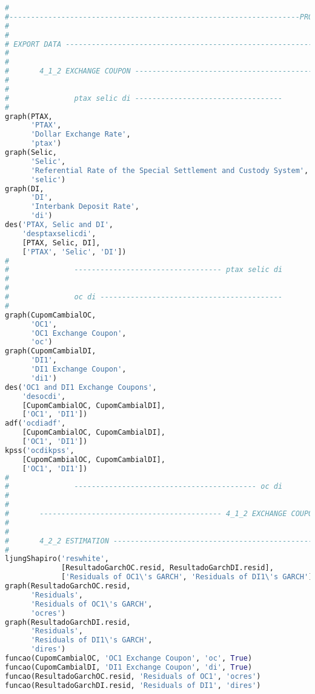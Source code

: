 \begin{lstlisting}[language=Python]
#
#-------------------------------------------------------------------PROCESS DATA
#
#
# EXPORT DATA ------------------------------------------------------------------
#
#
#		4_1_2 EXCHANGE COUPON ------------------------------------------
#
#
#				ptax selic di ----------------------------------
#
graph(PTAX,
      'PTAX',
      'Dollar Exchange Rate',
      'ptax')
graph(Selic,
      'Selic',
      'Referential Rate of the Special Settlement and Custody System',
      'selic')
graph(DI,
      'DI',
      'Interbank Deposit Rate',
      'di')
des('PTAX, Selic and DI',
    'desptaxselicdi',
    [PTAX, Selic, DI],
    ['PTAX', 'Selic', 'DI'])
#
#				---------------------------------- ptax selic di
#
#
#				oc di ------------------------------------------
#
graph(CupomCambialOC,
      'OC1',
      'OC1 Exchange Coupon',
      'oc')
graph(CupomCambialDI,
      'DI1',
      'DI1 Exchange Coupon',
      'di1')
des('OC1 and DI1 Exchange Coupons',
    'desocdi',
    [CupomCambialOC, CupomCambialDI],
    ['OC1', 'DI1'])
adf('ocdiadf',
    [CupomCambialOC, CupomCambialDI],
    ['OC1', 'DI1'])
kpss('ocdikpss',
    [CupomCambialOC, CupomCambialDI],
    ['OC1', 'DI1'])
#
#				------------------------------------------ oc di
#
#
#		------------------------------------------ 4_1_2 EXCHANGE COUPON
#
#
#		4_2_2 ESTIMATION -----------------------------------------------
#
ljungShapiro('reswhite',
             [ResultadoGarchOC.resid, ResultadoGarchDI.resid],
             ['Residuals of OC1\'s GARCH', 'Residuals of DI1\'s GARCH'])
graph(ResultadoGarchOC.resid,
      'Residuals',
      'Residuals of OC1\'s GARCH',
      'ocres')
graph(ResultadoGarchDI.resid,
      'Residuals',
      'Residuals of DI1\'s GARCH',
      'dires')
funcao(CupomCambialOC, 'OC1 Exchange Coupon', 'oc', True)
funcao(CupomCambialDI, 'DI1 Exchange Coupon', 'di', True)
funcao(ResultadoGarchOC.resid, 'Residuals of OC1', 'ocres')
funcao(ResultadoGarchDI.resid, 'Residuals of DI1', 'dires')


\end{lstlisting}
